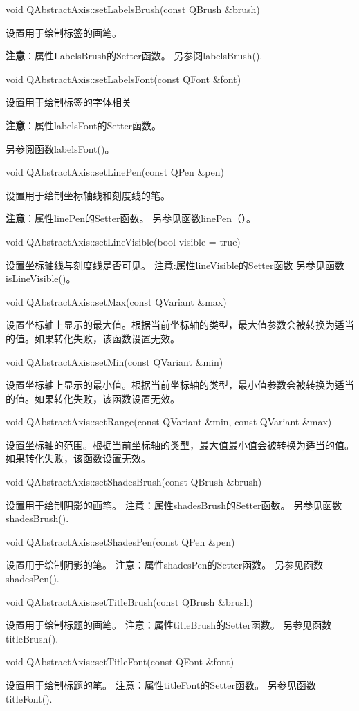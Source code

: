 void QAbstractAxis::setLabelsBrush(const QBrush \&brush)

 设置用于绘制标签的画笔。 

\textbf{注意}：属性LabelsBrush的Setter函数。 另参阅labelsBrush().

void QAbstractAxis::setLabelsFont(const QFont \&font) 

设置用于绘制标签的字体相关 

\textbf{注意}：属性labelsFont的Setter函数。 

另参阅函数labelsFont()。

void QAbstractAxis::setLinePen(const QPen \&pen) 

设置用于绘制坐标轴线和刻度线的笔。 

\textbf{注意}：属性linePen的Setter函数。 另参见函数linePen（）。

void QAbstractAxis::setLineVisible(bool visible = true) 

设置坐标轴线与刻度线是否可见。 注意:属性lineVisible的Setter函数 另参见函数isLineVisible()。

void QAbstractAxis::setMax(const QVariant \&max) 

设置坐标轴上显示的最大值。根据当前坐标轴的类型，最大值参数会被转换为适当的值。如果转化失败，该函数设置无效。

void QAbstractAxis::setMin(const QVariant \&min) 

设置坐标轴上显示的最小值。根据当前坐标轴的类型，最小值参数会被转换为适当的值。如果转化失败，该函数设置无效。

void QAbstractAxis::setRange(const QVariant \&min, const QVariant
\&max) 

设置坐标轴的范围。根据当前坐标轴的类型，最大值最小值会被转换为适当的值。如果转化失败，该函数设置无效。

void QAbstractAxis::setShadesBrush(const QBrush \&brush)

 设置用于绘制阴影的画笔。 注意：属性shadesBrush的Setter函数。 另参见函数shadesBrush().

void QAbstractAxis::setShadesPen(const QPen \&pen)

 设置用于绘制阴影的笔。 注意：属性shadesPen的Setter函数。 另参见函数shadesPen().

void QAbstractAxis::setTitleBrush(const QBrush \&brush) 

设置用于绘制标题的画笔。 注意：属性titleBrush的Setter函数。 另参见函数titleBrush().

void QAbstractAxis::setTitleFont(const QFont \&font) 

设置用于绘制标题的笔。 注意：属性titleFont的Setter函数。 另参见函数titleFont().

